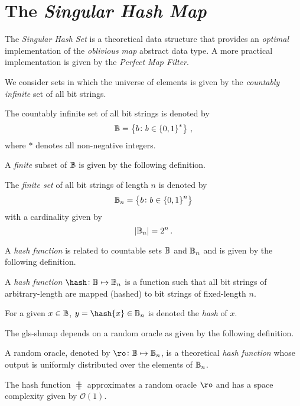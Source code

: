\documentclass[ ../main.tex]{subfiles}
\begin{document}
\section{The \emph{Singular Hash Map}}
The \emph{Singular Hash Set} is a theoretical data structure that provides an \emph{optimal} implementation of the \emph{oblivious map} abstract data type. A more practical implementation is given by the \emph{Perfect Map Filter}\cite{pmf}.

We consider sets in which the universe of elements is given by the \emph{countably infinite} set of all bit strings.
\begin{definition}
The countably infinite set of all bit strings is denoted by
\begin{equation}
    \mathbb{B} = \left\{b \colon b \in \left\{0,1\right\}^*\right\}\,,
\end{equation}
where $*$ denotes all non-negative integers.
\end{definition}
A \emph{finite} subset of $\mathbb{B}$ is given by the following definition.
\begin{definition}
The \emph{finite set} of all bit strings of length $n$ is denoted by
\begin{equation}
    \mathbb{B}_n = \left\{b \colon b \in \left\{0,1\right\}^n\right\}
\end{equation}
with a cardinality given by
\begin{equation}
    \left\vert{\mathbb{B}_n}\right\vert = 2^n\,.
\end{equation}
\end{definition}

A \emph{hash function} is related to countable sets $\mathbb{B}$ and $\mathbb{B}_n$ and is given by the following definition.
\begin{definition}
A \emph{hash function} $\hash \colon \cisb \mapsto \cisb_n$ is a function such that all bit strings of arbitrary-length are mapped (hashed) to bit strings of fixed-length $n$.
\end{definition}
For a given $x \in \mathbb{B}$, $y = \hash{x} \in \cisb_n$ is denoted the \emph{hash} of $x$.









The \gls{gls-shmap} depends on a random oracle as given by the following definition.
\begin{definition}
\label{def:randomoracle}
A random oracle, denoted by $\ro \colon \cisb \mapsto \cisb_n$, is a theoretical \emph{hash function} whose output is uniformly distributed over the elements of $\mathbb{B}_n$.
\end{definition}
\begin{assumption}
The hash function $\hash$ approximates a random oracle $\ro$ and has a space complexity given by $\mathcal{O}(1)$.
\end{assumption}
\end{document}
